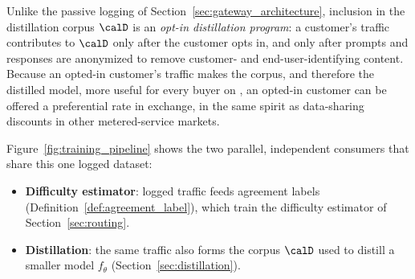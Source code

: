Unlike the passive logging of Section~\ref{sec:gateway_architecture},
inclusion in the distillation corpus $\calD$ is an \emph{opt-in
distillation program}: a customer's traffic contributes to $\calD$ only
after the customer opts in, and only after prompts and responses are
anonymized to remove customer- and end-user-identifying content. Because
an opted-in customer's traffic makes the corpus, and therefore the
distilled model, more useful for every buyer on \NoesisMarket, an
opted-in customer can be offered a preferential rate in exchange, in the
same spirit as data-sharing discounts in other metered-service markets.

Figure~\ref{fig:training_pipeline} shows the two parallel, independent
consumers that share this one logged dataset:

\begin{itemize}
  \item \textbf{Difficulty estimator}: logged traffic feeds agreement labels
    (Definition~\ref{def:agreement_label}), which train the difficulty
    estimator of Section~\ref{sec:routing}.
  \item \textbf{Distillation}: the same traffic also forms the corpus $\calD$
    used to distill a smaller model $f_\theta$
    (Section~\ref{sec:distillation}).
\end{itemize}

